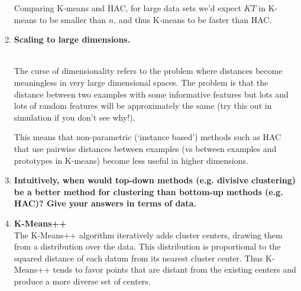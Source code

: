 \documentclass[12pt,letterpaper]{article}
\begin{document}
\begin{enumerate}
\begin{solution}
Comparing K-means and HAC, for large data sets we'd expect $KT$ in
K-means to be smaller than $n$, and thus K-means to be faster than
HAC.
\end{solution}

\item {\bf Scaling to large dimensions.}\\
\\

\begin{solution}
The curse of dimensionality refers to the problem
%
%
where distances become meaningless in very large dimensional spaces.
The problem is that the distance
between two examples with
some informative features but lots
and lots of random features 
will be approximately the same (try this out in simulation
if you don't see why!). 

This means that non-parametric (`instance based') 
methods such as HAC that use pairwise distances between
examples (vs between examples and prototypes in K-means) 
become less useful in higher dimensions.

\end{solution}

\item {\bf Intuitively, when would top-down methods (e.g. divisive clustering) be a better method for clustering than bottom-up methods (e.g. HAC)? Give your answers in terms of data.}\\

\item {\bf K-Means++ }\\
The K-Means++ algorithm iteratively adds cluster centers, drawing them from a distribution over the data.  This distribution is proportional to the squared distance of each datum from its nearest cluster center.  Thus K-Means++ tends to favor points that are distant from the existing centers and produce a more diverse set of centers.

\fi


\end{enumerate}
\end{document}
